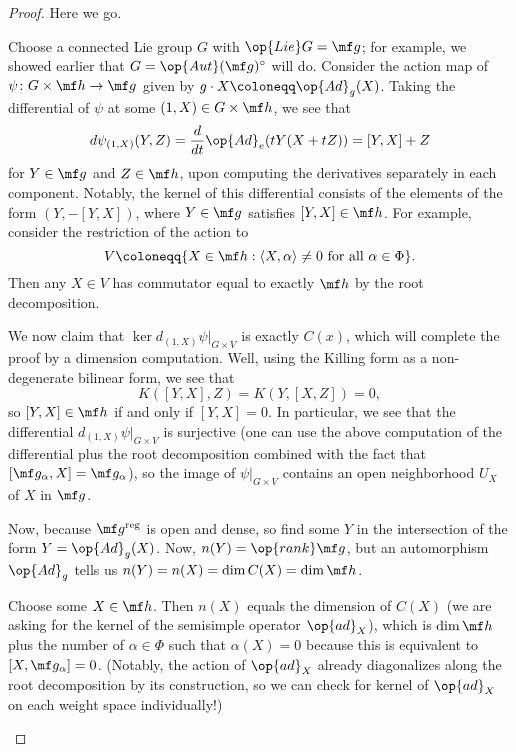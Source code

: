 \documentclass[../notes.tex]{subfiles}
\begin{document}
\begin{proof}
	Here we go.
	\begin{listalph}
		\item Choose a connected Lie group $G$ with $\op{Lie}G=\mf g$; for example, we showed earlier that $G=\op{Aut}(\mf g)^\circ$ will do. Consider the action map of $\psi\colon G\times\mf h\to\mf g$ given by $g\cdot X\coloneqq\op{Ad}_g(X)$. Taking the differential of $\psi$ at some $(1,X)\in G\times\mf h$, we see that
		\[d\psi_{(1,X)}(Y,Z)=\frac d{dt}\op{Ad}_e(tY(X+tZ))=[Y,X]+Z\]
		for $Y\in\mf g$ and $Z\in\mf h$, upon computing the derivatives separately in each component. Notably, the kernel of this differential consists of the elements of the form $(Y,-[Y,X])$, where $Y\in\mf g$ satisfies $[Y,X]\in\mf h$. For example, consider the restriction of the action to
		\[V\coloneqq\{X\in\mf h:\langle X,\alpha\rangle\ne0\text{ for all }\alpha\in\Phi\}.\]
		Then any $X\in V$ has commutator equal to exactly $\mf h$ by the root decomposition.
		
		We now claim that $\ker d_{(1,X)}\psi|_{G\times V}$ is exactly $C(x)$, which will complete the proof by a dimension computation. Well, using the Killing form as a non-degenerate bilinear form, we see that
		\[K([Y,X],Z)=K(Y,[X,Z])=0,\]
		so $[Y,X]\in\mf h$ if and only if $[Y,X]=0$. In particular, we see that the differential $d_{(1,X)}\psi|_{G\times V}$ is surjective (one can use the above computation of the differential plus the root decomposition combined with the fact that $[\mf g_\alpha,X]=\mf g_\alpha$), so the image of $\psi|_{G\times V}$ contains an open neighborhood $U_X$ of $X$ in $\mf g$.

		Now, because $\mf g^{\mathrm{reg}}$ is open and dense, so find some $Y$ in the intersection of the form $Y=\op{Ad}_g(X)$. Now, $n(Y)=\op{rank}\mf g$, but an automorphism $\op{Ad}_g$ tells us $n(Y)=n(X)=\dim C(X)=\dim\mf h$.

		\item Choose some $X\in\mf h$. Then $n(X)$ equals the dimension of $C(X)$ (we are asking for the kernel of the semisimple operator $\op{ad}_X$), which is $\dim\mf h$ plus the number of $\alpha\in\Phi$ such that $\alpha(X)=0$ because this is equivalent to $[X,\mf g_\alpha]=0$. (Notably, the action of $\op{ad}_X$ already diagonalizes along the root decomposition by its construction, so we can check for kernel of $\op{ad}_X$ on each weight space individually!)
		\qedhere
	\end{listalph}
\end{proof}
\end{document}
